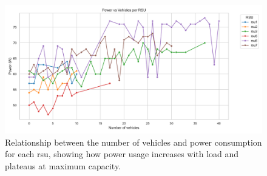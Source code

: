 \begin{figure}[!htb]
    \centering
    \includegraphics[width=1\columnwidth]{Figures/power_vehicles_rsu_maximums.pdf}
    \caption{Relationship between the number of vehicles and power consumption for each \gls{rsu}, showing how power usage increases with load and plateaus at maximum capacity.}
    \label{fig:exp1-figure}
\end{figure}